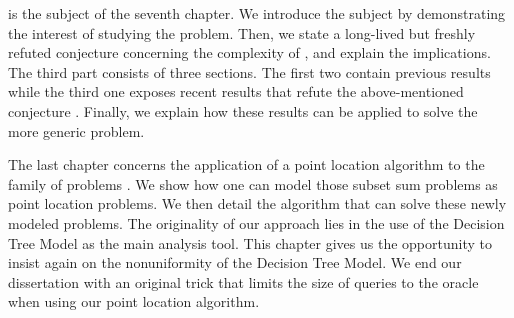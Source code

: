 \threeSUM is the subject of the seventh chapter. We introduce the
subject by demonstrating the interest of studying the \threeSUM problem. Then,
we state a long-lived but freshly refuted conjecture concerning the
complexity of \threeSUM, and explain the implications. The third part
consists of three sections. The first two contain previous results while
the third one exposes recent results that refute the above-mentioned
conjecture \cite{gronlund:2014}. Finally, we explain how these results can be applied to solve
the more generic \kLDT problem.

The last chapter concerns the application of a point location algorithm to the
family of \kSUM problems \cite{meiser:1993,burgisser:1997}. We show how one can
model those subset sum problems as point location problems. We then detail the
algorithm that can solve these newly modeled problems. The originality of our
approach lies in the use of the Decision Tree Model as the main analysis tool.
This chapter gives us the opportunity to insist again on the
nonuniformity of the Decision Tree Model. We end our dissertation with an
original trick that limits the size of queries to the oracle when using our
point location algorithm.
